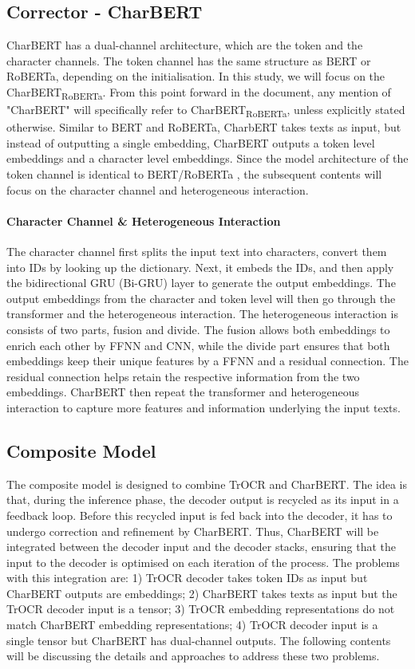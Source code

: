 \subsection{Corrector - CharBERT}
\label{subsec:3_corrector_charbert}
CharBERT has a dual-channel architecture, which are the token and the character channels. The token channel has the same structure as BERT or RoBERTa, depending on the initialisation. In this study, we will focus on the CharBERT\textsubscript{RoBERTa}. From this point forward in the document, any mention of "CharBERT" will specifically refer to CharBERT\textsubscript{RoBERTa}, unless explicitly stated otherwise. Similar to BERT and RoBERTa, CharbERT takes texts as input, but instead of outputting a single embedding, CharBERT outputs a token level embeddings and a character level embeddings. Since the model architecture of the token channel is identical to BERT/RoBERTa , the subsequent contents will focus on the character channel and heterogeneous interaction.

\paragraph*{Character Channel \& Heterogeneous Interaction}
\label{par:3_character_channel_heterogeneous_interaction}
The character channel first splits the input text into characters, convert them into IDs by looking up the dictionary. Next, it embeds the IDs, and then apply the bidirectional GRU (Bi-GRU) layer to generate the output embeddings. The output embeddings from the character and token level will then go through the transformer and the heterogeneous interaction. The heterogeneous interaction is consists of two parts, fusion and divide. The fusion allows both embeddings to enrich each other by FFNN and CNN, while the divide part ensures that both embeddings keep their unique features by a FFNN and a residual connection. The residual connection helps retain the respective information from the two embeddings. CharBERT then repeat the transformer and heterogeneous interaction to capture more features and information underlying the input texts.

\subsection{Composite Model}
\label{subsec:3_composite_model}
The composite model is designed to combine TrOCR and CharBERT. The idea is that, during the inference phase, the decoder output is recycled as its input in a feedback loop. Before this recycled input is fed back into the decoder, it has to undergo correction and refinement by CharBERT. Thus, CharBERT will be integrated between the decoder input and the decoder stacks, ensuring that the input to the decoder is optimised on each iteration of the process. The problems with this integration are: 1) TrOCR decoder takes token IDs as input but CharBERT outputs are embeddings; 2) CharBERT takes texts as input but the TrOCR decoder input is a tensor; 3) TrOCR embedding representations do not match CharBERT embedding representations; 4) TrOCR decoder input is a single tensor but CharBERT has dual-channel outputs. The following contents will be discussing the details and approaches to address these two problems.

